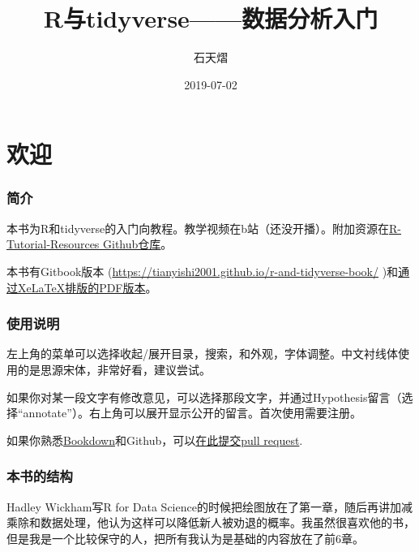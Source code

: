 \documentclass[]{book}
\title{R与tidyverse------数据分析入门}
\author{石天熠}
\date{2019-07-02}
\begin{document}
\maketitle

{
\setcounter{tocdepth}{1}
\tableofcontents
}
\hypertarget{welcome}{%
\chapter*{欢迎}\label{welcome}}

\hypertarget{ux7b80ux4ecb}{%
\subsection*{简介}\label{ux7b80ux4ecb}}

本书为R和tidyverse的入门向教程。教学视频在b站（还没开播）。附加资源在\href{https://github.com/TianyiShi2001/R-Tutorial-Resorces}{R-Tutorial-Resources Github仓库}。

本书有Gitbook版本 (\url{https://tianyishi2001.github.io/r-and-tidyverse-book/} )和\href{https://tianyishi2001.github.io/r-and-tidyverse-book/R与tidyverse——数据分析入门.pdf}{通过XeLaTeX排版的PDF版本}。

\hypertarget{ux8bf4ux660e}{%
\subsection*{使用说明}\label{ux8bf4ux660e}}

左上角的菜单可以选择收起/展开目录，搜索，和外观，字体调整。中文衬线体使用的是思源宋体，非常好看，建议尝试。

如果你对某一段文字有修改意见，可以选择那段文字，并通过Hypothesis留言（选择``annotate''）。右上角可以展开显示公开的留言。首次使用需要注册。

如果你熟悉\href{https://bookdown.org}{Bookdown}和Github，可以\href{https://github.com/TianyiShi2001/r-and-tidyverse-book}{在此提交pull request}.

\subsection*{本书的结构}

Hadley Wickham写R for Data Science的时候把绘图放在了第一章，随后再讲加减乘除和数据处理，他认为这样可以降低新人被劝退的概率。我虽然很喜欢他的书，但是我是一个比较保守的人，把所有我认为是基础的内容放在了前6章。
\end{document}
